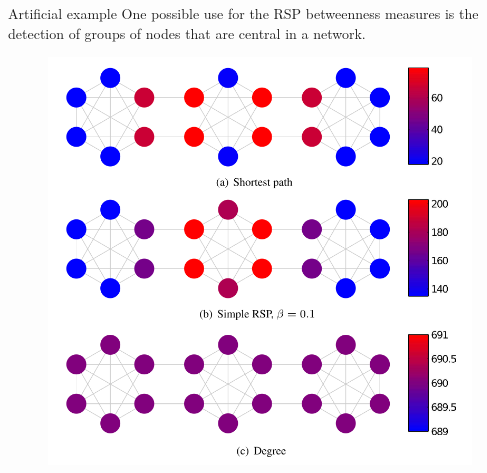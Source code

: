 \documentclass[13pt]{beamer}
\begin{document}
    \begin{frame}[t,allowframebreaks]{Artificial example}
    One possible use for the RSP betweenness measures is the detection of groups of nodes that are central in a network.

    \begin{figure}
    \includegraphics[height =0.6\paperheight]{Images/heat1.png}
    \end{figure}
    \end{frame}
\end{document}
